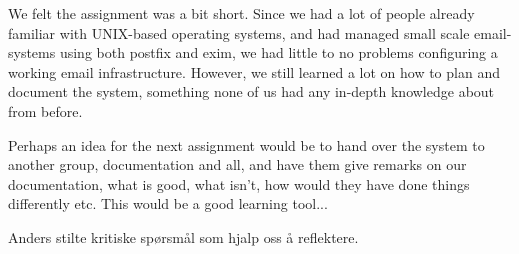 
We felt the assignment was a bit short. Since we had a lot of people already
familiar with UNIX-based operating systems, and had managed small scale email-systems using both postfix and exim, we had little to no problems configuring a working email infrastructure. However, we still learned a lot on how to plan and document the system, something none of us had any in-depth knowledge about from before. 

Perhaps an idea for the next assignment would be to hand over the system to another group, documentation and all, and have them give remarks on our documentation, what is good, what isn't, how would they have done things differently etc. This would be a good learning tool...

Anders stilte kritiske spørsmål som hjalp oss å reflektere.
